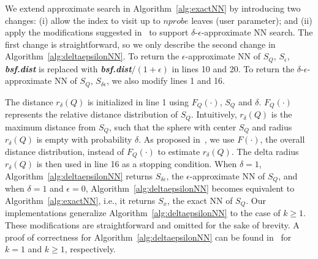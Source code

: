 We extend approximate search in Algorithm~\ref{alg:exactNN} by introducing two changes: (i) allow the index to visit up to $nprobe$ leaves (user parameter); and (ii) apply the modifications suggested in~\cite{conf/icde/Ciaccia2000} to support $\delta$-$\epsilon$-approximate NN search. 
The first change is straightforward, so we only describe the second change in Algorithm~\ref{alg:deltaepsilonNN}. 
%
%
To return the $\epsilon$-approximate NN of $S_Q$, $S_\epsilon$, {\bf\emph{bsf.dist}} is replaced with {\bf\emph{bsf.dist$/(1+\epsilon)$}} in lines 10 and 20.  
To return the $\delta$-$\epsilon$-approximate NN of $S_Q$, $S_{\delta\epsilon}$, we also modify lines 1 and 16.

The distance $r_\delta(Q)$ is initialized in line 1 using $F_Q(\cdot)$, $S_Q$ and $\delta$. $F_Q(\cdot)$ represents the relative distance distribution of $S_Q$. 
Intuitively, $r_\delta(Q)$ is the maximum distance from $S_Q$, such that the sphere with center $S_Q$ and radius $r_\delta(Q)$ is empty with probability $\delta$. 
As proposed in~\cite{conf/pods/Ciaccia1998}, we use $F(\cdot)$, the overall distance distribution, instead of $F_Q(\cdot)$ to estimate $r_\delta(Q)$. 
The delta radius $r_\delta(Q)$ is then used in line 16 as a stopping condition.
When  $\delta = 1$, Algorithm~\ref{alg:deltaepsilonNN} returns $S_{\delta\epsilon}$, the $\epsilon$-approximate NN of $S_Q$, and when $\delta = 1$ and $\epsilon=0$, Algorithm~\ref{alg:deltaepsilonNN} becomes equivalent to Algorithm~\ref{alg:exactNN}, i.e., it returns $S_x$, the exact NN of $S_Q$. 
Our implementations generalize Algorithm~\ref{alg:deltaepsilonNN} to the case of $k \ge 1$. 
These modifications are straightforward and omitted for the sake of brevity. 
A proof of correctness for Algorithm~\ref{alg:deltaepsilonNN} can be found in~\cite{conf/icde/Ciaccia2000,conf/sisap/ciaccia17} for $k = 1$ and $k \ge 1$, respectively.
 


